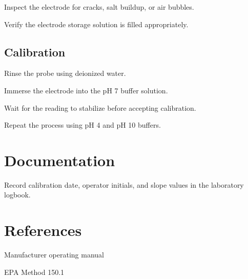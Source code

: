 \documentclass{SOP5}\usepackage[]{graphicx}\usepackage[]{xcolor}
\begin{document}
\NP
Inspect the electrode for cracks, salt buildup, or air bubbles.

\NP
Verify the electrode storage solution is filled appropriately.

\subsection{Calibration}

\NP
Rinse the probe using deionized water.

\NP
Immerse the electrode into the pH 7 buffer solution.

\NP
Wait for the reading to stabilize before accepting calibration.

\NP
Repeat the process using pH 4 and pH 10 buffers.

\section{Documentation}

\NP
Record calibration date, operator initials, and slope values in the laboratory logbook.

\section{References}

\begin{enumerate*}
    \item Manufacturer operating manual
    \item EPA Method 150.1
\end{enumerate*}
\end{document}
